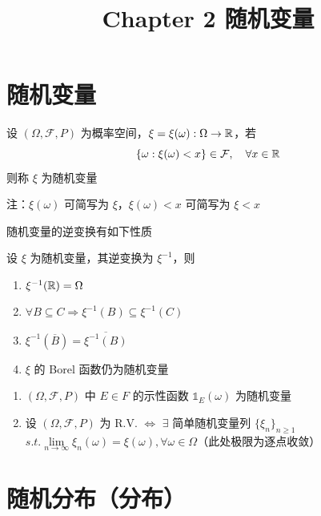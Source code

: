 \documentclass[12pt,a4paper]{amsart}
\title{Chapter 2 随机变量}
\begin{document}
\maketitle\cite{杨振明2007}

\section{随机变量}

\begin{definition}[随机变量]
    设 $(\Omega, \mathcal{F}, P)$ 为概率空间，$\xi = \xi(\omega): \Omega\to\mathbb{R}$，若
    \begin{equation}
        \{\omega: \xi(\omega) < x\} \in \mathcal{F}, \quad \forall x \in \mathbb{R}
    \end{equation}
    则称 $\xi$ 为随机变量
\end{definition}

注：$\xi(\omega)$ 可简写为 $\xi$，$\xi(\omega) < x$ 可简写为 $\xi < x$

随机变量的逆变换有如下性质

\begin{proposition}
    设 $\xi$ 为随机变量，其逆变换为 $\xi^{-1}$，则
    \begin{enumerate}
        \item $\xi^{-1}(\mathbb{R})=\Omega$
        \item $\forall B\subseteq C \Rightarrow \xi^{-1}(B) \subseteq \xi^{-1}(C)$
        \item $\xi^{-1}(\overline{B}) = \overline{\xi^{-1}(B)}$
        \item $\xi$ 的 Borel 函数仍为随机变量
    \end{enumerate}
\end{proposition}

\begin{proposition}[随机变量的结构]
    \begin{enumerate}
        \item $(\Omega, \mathcal{F}, P)$ 中 $E\in F$ 的示性函数 $\mathbb{1}_E(\omega)$ 为随机变量
        \item 设 $(\Omega, \mathcal{F}, P)$ 为 R.V. $\Leftrightarrow$ $\exists$ 简单随机变量列 $\{\xi_n\}_{n\geq 1}$ $s.t. \lim\limits_{n\to\infty}\xi_n(\omega)=\xi(\omega), \forall\omega\in\Omega$（此处极限为逐点收敛）
    \end{enumerate}
\end{proposition}

\section{随机分布（分布）}
\end{document}
